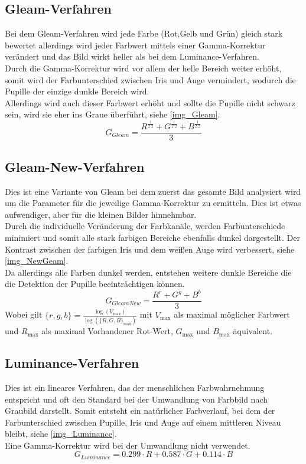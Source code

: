\subsection{Gleam-Verfahren}
\label{gray_Gleam}
Bei dem Gleam-Verfahren wird jede Farbe (Rot,Gelb und Grün) gleich stark bewertet allerdings wird jeder Farbwert mittels einer Gamma-Korrektur verändert und das Bild wirkt heller als bei dem Luminance-Verfahren.\\
Durch die Gamma-Korrektur wird vor allem der helle Bereich weiter erhöht, somit wird der Farbunterschied zwischen Iris und Auge vermindert, wodurch die Pupille der einzige dunkle Bereich wird.\\
Allerdings wird auch dieser Farbwert erhöht und sollte die Pupille nicht schwarz sein, wird sie eher ins Graue überführt, siehe \autoref{img_Gleam}.\\
\[G_{Gleam}=\dfrac{R^{\frac{1}{2.2}} + G^{\frac{1}{2.2}} + B^{\frac{1}{2.2}}}{3}\]
\subsection{Gleam-New-Verfahren}
\label{gray_New}
Dies ist eine Variante von Gleam bei dem zuerst das gesamte Bild analysiert wird um die Parameter für die jeweilige Gamma-Korrektur zu ermitteln. Dies ist etwas aufwendiger, aber für die kleinen Bilder hinnehmbar.\\
Durch die individuelle Veränderung der Farbkanäle, werden Farbunterschiede minimiert und somit alle stark farbigen Bereiche ebenfalls dunkel dargestellt. Der Kontrast zwischen der farbigen Iris und dem weißen Auge wird verbessert, siehe \autoref{img_NewGeam}.\\
Da allerdings alle Farben dunkel werden, entstehen weitere dunkle Bereiche die die Detektion der Pupille beeinträchtigen können.
\[G_{Gleam New}=\dfrac{R^{r} + G^{g} + B^{b}}{3}\]
Wobei gilt $\{r,g,b\} = \frac{\log(V_{\max})}{\log(\{R,G,B\}_{\max})}$ mit $V_{\max}$ als maximal möglicher Farbwert und $R_{\max}$ als maximal Vorhandener Rot-Wert, $G_{\max}$ und $B_{\max}$ äquivalent.
\subsection{Luminance-Verfahren}
\label{gray_Luminance}
Dies ist ein lineares Verfahren, das der menschlichen Farbwahrnehmung entspricht und oft den Standard bei der Umwandlung von Farbbild nach Graubild darstellt. Somit entsteht ein natürlicher Farbverlauf, bei dem der Farbunterschied zwischen Pupille, Iris und Auge auf einem mittleren Niveau bleibt, siehe \autoref{img_Luminance}.\\
Eine Gamma-Korrektur wird bei der Umwandlung nicht verwendet.
\[G_{Luminance} = 0.299 \cdot R + 0.587 \cdot G + 0.114 \cdot B\]
